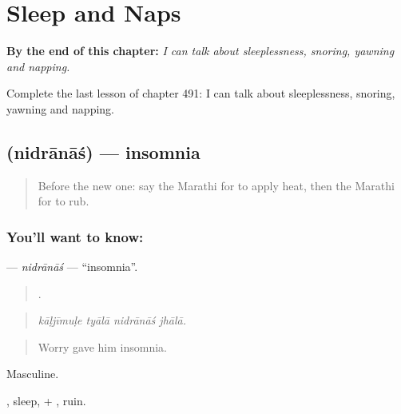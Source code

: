 
\chapter{Sleep and Naps}
\label{ch:mr-sleep-and-naps}

\begin{chapteropening}
\textbf{By the end of this chapter:} \emph{I can talk about sleeplessness, snoring, yawning and napping.}

Complete the last lesson of chapter 491: I can talk about sleeplessness, snoring, yawning and napping.
\end{chapteropening}

\section[\texorpdfstring{\mr{निद्रानाश} (nidrānāś)}{निद्रानाश (nidrānāś)}]{ (nidrānāś) — insomnia}

\label{lesson:MR-C491-nidranas}



\begin{quote}
Before the new one: say the Marathi for to apply heat, then the Marathi for to rub.
\end{quote}

\subsection*{You'll want to know: }
\textbf{} — \emph{nidrānāś} — \textquotedblleft{}insomnia\textquotedblright{}.

\begin{quote}
   .
\end{quote}

\begin{quote}
\emph{kāḷjīmuḷe tyālā nidrānāś jhālā.}
\end{quote}

\begin{quote}
Worry gave him insomnia.
\end{quote}

Masculine.

, sleep, + , ruin.

